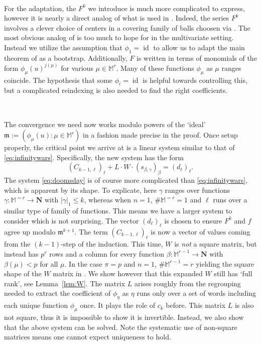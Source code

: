 \documentclass[10pt]{amsart}
\theoremstyle{Theorem}
\theoremstyle{definition}
\newcommand{\NN}{\mathbf N}
\newcommand{\id}{\operatorname{id}}
\newcommand{\fm}{\mathfrak{m}}
\def\cs{s}
\begin{document}
\

For the adaptation, the  
$F^k$ we introduce is much more complicated to express, however it is nearly a direct analog of what is used in \cite{BRS11}. Indeed, the series $F^k$ involves a clever choice of centers in a covering family of balls choosen via \cite[Lem. 11]{BRS11}. The most obvious analog of \cite[Lem. 11]{BRS11} is too much to hope for in the multivariate setting. Instead we utilize the assumption that $\phi_1 = \id$ to allow us to adapt the main theorem of \cite{BRS11} as a bootstrap. 
Additionally, $F$ is written in terms of monomials of the form $\phi_\mu(u)^{j(\mu)}$ for various $\mu \in \mathbb{M}^r$. Many of these functions $\phi_\mu$ as $\mu$ ranges coincide. The hypothesis that some $\phi_i = \id$ is helpful towards controlling this, but a complicated reindexing is also needed to find the right coefficients. 

\ 

 The convergence we need now works modulo powers of the `ideal' $\fm := (\phi_\mu(u) \colon \mu \in \mathbb{M}^r)$ in a fashion made precise in the proof. Once setup properly, the critical point we arrive at is a linear system similar to that of \eqref{eq:infinitywars}. Specifically, the new system has the form 
\begin{equation}\label{eq:doomsday}
(C_{k-1,\ell})_\ell + L \cdot W \cdot (\cs_{\beta,\gamma})_\beta = (d_\ell)_\ell. 
\end{equation}
The system \eqref{eq:doomsday} is of course more complicated than \eqref{eq:infinitywars}, which is apparent by its shape. To explicate, here $\gamma$ ranges over functions $\gamma \colon {\mathbb M}^{= r} \to \NN$ with $|\gamma|_1 \leq k$, whereas when $n = 1$, $\# {\mathbb M}^{=r} = 1$ and $\ell$ runs over a similar type of family of functions. This means we have a larger system to consider which is not surprising. The vector $(d_\ell)_\ell$ is chosen to ensure $F^k$ and $f$ agree up modulo $\fm^{k+1}$. The term $(C_{k-1,\ell})_\ell$ is now a vector of values coming from the $(k-1)$-step of the induction. This time, $W$ is {\it not} a square matrix, but instead has $p^r$ rows and a column for every function $\beta \colon \mathbb{M}^{r-1} \to \NN$ with $\beta(\mu) < p$ for all $\mu$. In the case $\pi = p$ and $n = 1$, $\# \mathbb{M}^{r-1} = r$ yielding the square shape of the $W$ matrix in \cite{BRS11}. We show however that this expanded $W$ still has `full rank', see Lemma~\ref{lem:W}. The matrix $L$ arises roughly from the regrouping needed to extract the coefficient of $\phi_\eta$ as $\eta$ runs only over a set of words including each unique function $\phi_\mu$ once. It plays the role of $c_k$ before. This matrix $L$ is also not square, thus it is impossible to show it is invertible. Instead, we also show that the above system can be solved. Note the systematic use of non-square matrices means one cannot expect uniqueness to hold. 
\end{document}
